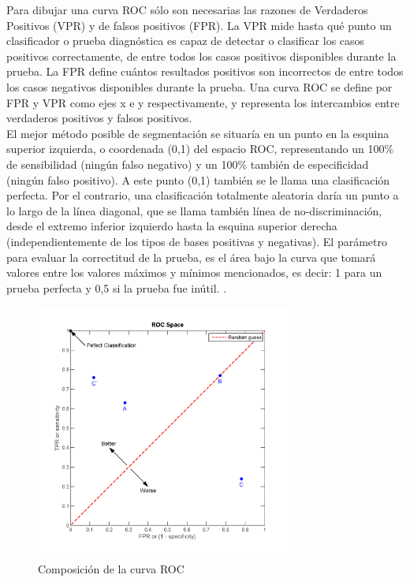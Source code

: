 Para dibujar una curva ROC s\'olo son necesarias las razones de Verdaderos Positivos (VPR) y de falsos positivos (FPR). La VPR mide hasta qu\'e punto un clasificador o prueba diagn\'ostica es capaz de detectar o clasificar los casos positivos correctamente, de entre todos los casos positivos disponibles durante la prueba. La FPR define cu\'antos resultados positivos son incorrectos de entre todos los casos negativos disponibles durante la prueba.
Una curva ROC se define por FPR y VPR como ejes x e y respectivamente, y representa los intercambios entre verdaderos positivos y falsos positivos. \cite{fawcett2004roc} \\
El mejor m\'etodo posible de segmentaci\'on se situar\'ia en un punto en la esquina superior izquierda, o coordenada (0,1) del espacio ROC, representando un 100\% de sensibilidad (ning\'un falso negativo) y un 100\% tambi\'en de especificidad (ning\'un falso positivo). A este punto (0,1) tambi\'en se le llama una clasificaci\'on perfecta. Por el contrario, una clasificaci\'on totalmente aleatoria dar\'ia un punto a lo largo de la l\'inea diagonal, que se llama tambi\'en l\'inea de no-discriminaci\'on, desde el extremo inferior izquierdo hasta la esquina superior derecha (independientemente de los tipos de bases positivas y negativas). El par\'ametro para evaluar la correctitud de la prueba, es el \'area bajo la curva que tomar\'a valores entre los valores m\'aximos y m\'inimos mencionados, es decir: 1  para un prueba perfecta y 0,5 si la prueba fue in\'util. 
\cite{wiki:curvaROC}.

\begin{figure}[H]
	{
	\centering
	\includegraphics[width=0.75\textwidth]{Figures/CurvaROC}
	\caption[Curva ROC]{Composici\'on de la curva ROC}
	\label{fig:Composici\'on de la curva ROC}
	}
\end{figure}


